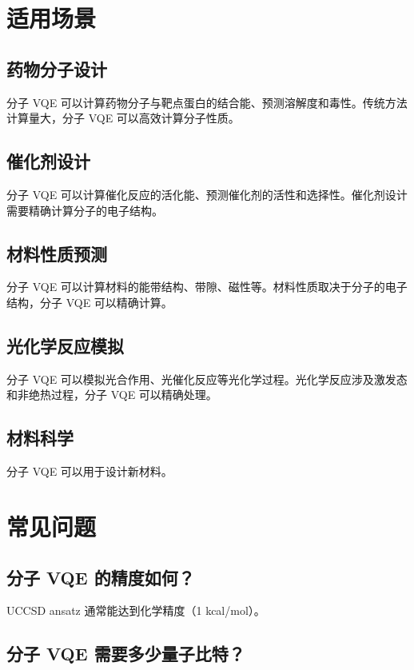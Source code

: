 \documentclass[12pt,a4paper]{article}
\begin{document}
\section{适用场景}

\subsection{药物分子设计}

分子 VQE 可以计算药物分子与靶点蛋白的结合能、预测溶解度和毒性。传统方法计算量大，分子 VQE 可以高效计算分子性质。

\subsection{催化剂设计}

分子 VQE 可以计算催化反应的活化能、预测催化剂的活性和选择性。催化剂设计需要精确计算分子的电子结构。

\subsection{材料性质预测}

分子 VQE 可以计算材料的能带结构、带隙、磁性等。材料性质取决于分子的电子结构，分子 VQE 可以精确计算。

\subsection{光化学反应模拟}

分子 VQE 可以模拟光合作用、光催化反应等光化学过程。光化学反应涉及激发态和非绝热过程，分子 VQE 可以精确处理。

\subsection{材料科学}

分子 VQE 可以用于设计新材料。

\section{常见问题}

\subsection{分子 VQE 的精度如何？}

UCCSD ansatz 通常能达到化学精度（1 kcal/mol）。

\subsection{分子 VQE 需要多少量子比特？}
\end{document}
